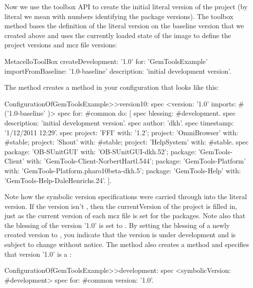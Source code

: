 \documentclass[a4paper,10pt,twoside]{book}
\begin{document}
Now we use the toolbox API to create the initial literal version of the project (by literal we mean with numbers identifying the package versions). The toolbox method  bases the definition of the literal version on the baseline version that we created above and uses the currently loaded state of the image to define the project versions and mcz file versions:

\begin{code}{}
  MetacelloToolBox
     createDevelopment: '1.0'
     for: 'GemToolsExample'
     importFromBaseline: '1.0-baseline'
     description: 'initial development version'.
\end{code}

The  method creates a  method in your configuration that looks like this:

\begin{code}{}
ConfigurationOfGemToolsExample>>version10: spec
  <version: '1.0' imports: #('1.0-baseline' )>
  spec for: #common do: [
     spec blessing: #development.
     spec description: 'initial development version'.
     spec author: 'dkh'.
     spec timestamp: '1/12/2011 12:29'.
     spec 
        project: 'FFI' with: '1.2';
        project: 'OmniBrowser' with: #stable;
        project: 'Shout' with: #stable;
        project: 'HelpSystem' with: #stable.
     spec
        package: 'OB-SUnitGUI' with: 'OB-SUnitGUI-dkh.52';
        package: 'GemTools-Client' with: 'GemTools-Client-NorbertHartl.544';
        package: 'GemTools-Platform' with: 'GemTools-Platform.pharo10beta-dkh.5';
        package: 'GemTools-Help' with: 'GemTools-Help-DaleHenrichs.24'. ].
\end{code}

Note how the  symbolic version specifications were carried through into the literal version. If the version isn't , then the currentVersion of the project is filled in, just as the current version of each mcz file is set for the packages. Note also that the blessing of the version '1.0' is set to . By setting the blessing of a newly created version to , you indicate that the version is under development and is subject to change without notice. The  method also creates a  method and specifies that version '1.0' is a :

\begin{code}{}
ConfigurationOfGemToolsExample>>development: spec
  <symbolicVersion: #development>
  spec for: #common version: '1.0'.
\end{code}
\end{document}
